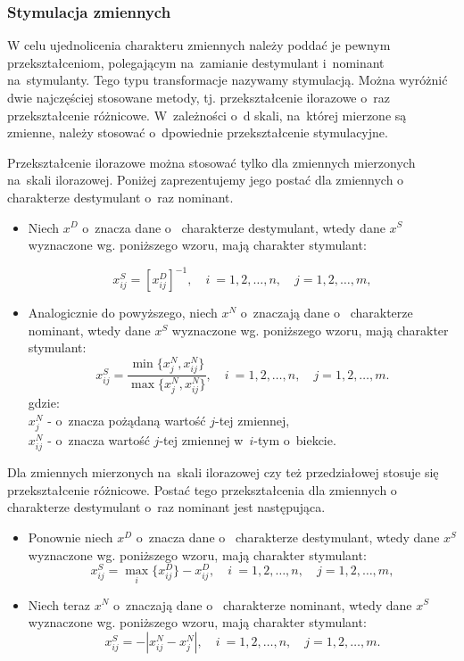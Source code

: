 \documentclass[12pt,a4paper]{report}
\begin{document}
\subsubsection{Stymulacja zmiennych}
W celu ujednolicenia charakteru zmiennych należy poddać je pewnym przekształceniom, polegającym na~zamianie destymulant i~nominant na~stymulanty. Tego typu transformacje nazywamy stymulacją. Można wyróżnić dwie najczęściej stosowane metody, tj. przekształcenie ilorazowe o~raz przekształcenie różnicowe. W~zależności o~d skali, na~której mierzone są zmienne, należy stosować o~dpowiednie przekształcenie stymulacyjne.

Przekształcenie ilorazowe można stosować tylko dla zmiennych mierzonych na~skali ilorazowej. Poniżej zaprezentujemy jego postać dla zmiennych o~ charakterze destymulant o~raz nominant.
\begin{itemize}
\item Niech $x^{D}$ o~znacza dane o~ charakterze destymulant, wtedy dane $x^{S}$ wyznaczone wg. poniższego wzoru, mają charakter stymulant:

$$
x_{ij}^{S}=[x_{ij}^{D}]^{-1},  \quad i~= 1,2, \ldots, n, \quad j=1,2,\ldots, m,
$$

\item Analogicznie do powyższego, niech $x^{N}$ o~znaczają dane o~ charakterze nominant, wtedy dane $x^{S}$ wyznaczone wg. poniższego wzoru, mają charakter stymulant:
$$
x_{ij}^{S}=\frac{\min\{x_{j}^{N},x_{ij}^{N}\}}{\max\{x_{j}^{N},x_{ij}^{N}\}}, \quad i~= 1,2, \ldots, n, \quad j=1,2,\ldots, m.
$$
gdzie:\\
$x_{j}^{N}$ - o~znacza pożądaną wartość $j$-tej zmiennej,\\
$x_{ij}^{N}$ - o~znacza wartość $j$-tej zmiennej w~$i$-tym o~biekcie.
\end{itemize}

Dla zmiennych mierzonych na~skali ilorazowej czy też przedziałowej stosuje się przekształcenie różnicowe. Postać tego przekształcenia dla zmiennych o~ charakterze destymulant o~raz nominant jest następująca.
\begin{itemize}

\item Ponownie niech $x^{D}$ o~znacza dane o~ charakterze destymulant, wtedy dane $x^{S}$ wyznaczone wg. poniższego wzoru, mają charakter stymulant:
$$
x_{ij}^{S}=\max\limits_{i} \{x_{ij}^{D}\} - x_{ij}^{D}, \quad i~= 1,2, \ldots, n, \quad j=1,2,\ldots, m,
$$
\item Niech teraz $x^{N}$ o~znaczają dane o~ charakterze nominant, wtedy dane $x^{S}$ wyznaczone wg. poniższego wzoru, mają charakter stymulant:
$$
x_{ij}^{S}=-|x_{ij}^{N}-x_{j}^{N}|, \quad i~= 1,2, \ldots, n, \quad j=1,2,\ldots, m.
$$
\end{itemize}
\end{document}
